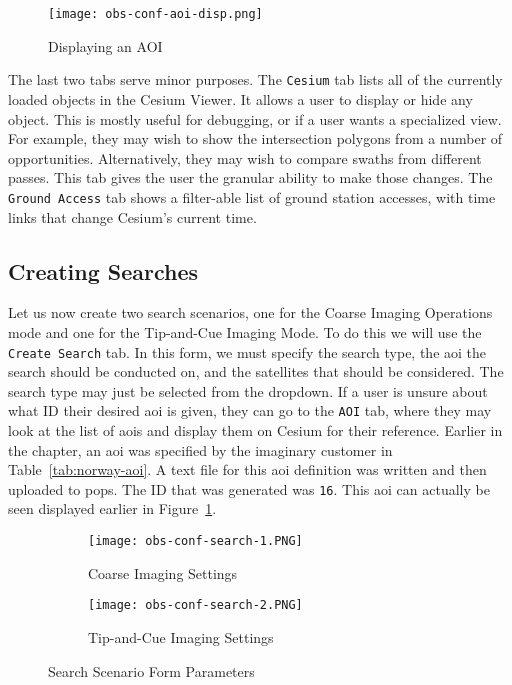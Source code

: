 \begin{figure}[h]
    \centering
    \texttt{[image: obs-conf-aoi-disp.png]} 
    \caption{Displaying an AOI}
    \label{fig:obs-conf-aoi-display} 
\end{figure}

The last two tabs serve minor purposes. The \texttt{Cesium} tab lists all of
the currently loaded objects in the Cesium Viewer. It allows a user to display
or hide any object. This is mostly useful for debugging, or if a user wants a
specialized view. For example, they may wish to show the intersection polygons
from a number of opportunities. Alternatively, they may wish to compare swaths
from different passes. This tab gives the user the granular ability to make
those changes. The \texttt{Ground Access} tab shows a filter-able list of
ground station accesses, with time links that change Cesium's current time.

\subsection{Creating Searches}

Let us now create two search scenarios, one for the Coarse Imaging Operations
mode and one for the Tip-and-Cue Imaging Mode. To do this we will use the
\texttt{Create Search} tab. In this form, we must specify the search type, the
\gls{aoi} the search should be conducted on, and the  satellites that should be
considered. The search type may just be selected from the dropdown. If a user
is unsure about what ID their desired \gls{aoi} is given, they can go to the
\texttt{AOI} tab, where they may look at the list of \glspl{aoi} and display
them on Cesium for their reference. Earlier in the chapter, an \gls{aoi} was
specified by the imaginary customer in Table~\ref{tab:norway-aoi}. A text file
for this \gls{aoi} definition was written and then uploaded to \gls{pops}. The
ID that was generated was \texttt{16}. This \gls{aoi} can actually be seen
displayed earlier in Figure~\ref{fig:obs-conf-aoi-display}.

\begin{figure}[h]
    \centering
    \begin{subfigure}[b]{0.49\textwidth}
	\centering
	\texttt{[image: obs-conf-search-1.PNG]} 
	\caption{Coarse Imaging Settings}
	\label{fig:obs-conf-search-1} 
    \end{subfigure}
    \hfill
    \begin{subfigure}[b]{0.49\textwidth}
	\centering
	\texttt{[image: obs-conf-search-2.PNG]} 
	\caption{Tip-and-Cue Imaging Settings}
	\label{fig:obs-conf-search-2} 
    \end{subfigure}
    \caption{Search Scenario Form Parameters}
    \label{fig:obs-conf-searches} 
\end{figure}



